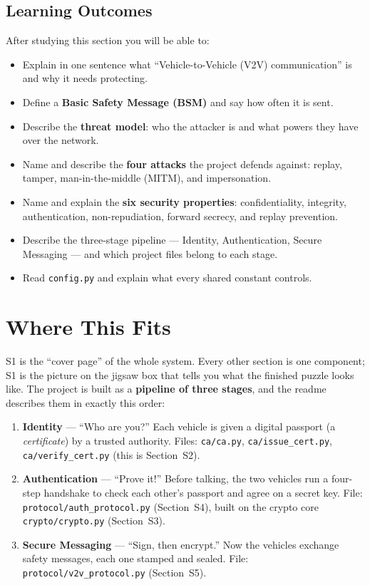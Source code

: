 \documentclass[11pt,a4paper]{article}
\begin{document}
\subsection*{Learning Outcomes}
After studying this section you will be able to:
\begin{itemize}
  \item Explain in one sentence what ``Vehicle-to-Vehicle (V2V) communication''
        is and why it needs protecting.
  \item Define a \textbf{Basic Safety Message (BSM)} and say how often it is sent.
  \item Describe the \textbf{threat model}: who the attacker is and what powers
        they have over the network.
  \item Name and describe the \textbf{four attacks} the project defends against:
        replay, tamper, man-in-the-middle (MITM), and impersonation.
  \item Name and explain the \textbf{six security properties}: confidentiality,
        integrity, authentication, non-repudiation, forward secrecy, and
        replay prevention.
  \item Describe the three-stage pipeline --- Identity, Authentication, Secure
        Messaging --- and which project files belong to each stage.
  \item Read \texttt{config.py} and explain what every shared constant controls.
\end{itemize}

\section{Where This Fits}

S1 is the ``cover page'' of the whole system. Every other section is one
component; S1 is the picture on the jigsaw box that tells you what the finished
puzzle looks like. The project is built as a \textbf{pipeline of three stages},
and the readme describes them in exactly this order:

\begin{enumerate}
  \item \textbf{Identity} --- ``Who are you?'' Each vehicle is given a digital
        passport (a \emph{certificate}) by a trusted authority. Files:
        \texttt{ca/ca.py}, \texttt{ca/issue\_cert.py}, \texttt{ca/verify\_cert.py}
        (this is Section~S2).
  \item \textbf{Authentication} --- ``Prove it!'' Before talking, the two
        vehicles run a four-step handshake to check each other's passport and
        agree on a secret key. File: \texttt{protocol/auth\_protocol.py}
        (Section~S4), built on the crypto core
        \texttt{crypto/crypto.py} (Section~S3).
  \item \textbf{Secure Messaging} --- ``Sign, then encrypt.'' Now the vehicles
        exchange safety messages, each one stamped and sealed. File:
        \texttt{protocol/v2v\_protocol.py} (Section~S5).
\end{enumerate}
\end{document}
